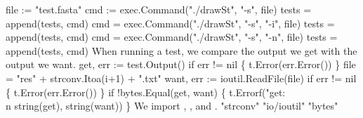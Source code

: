 file := "test.fasta"
cmd := exec.Command("./drawSt", "-s", file)
tests = append(tests, cmd)
cmd = exec.Command("./drawSt", "-s", "-i", file)
tests = append(tests, cmd)
cmd = exec.Command("./drawSt", "-s", "-n", file)
tests = append(tests, cmd)
\nwendcode{}\nwdocspar
When running a test, we compare the output we get with the output we
want.
\nwenddocs{}\endmoddef\nwstartdeflinemarkup{}\nwenddeflinemarkup
get, err := test.Output()
if err != nil \{ t.Error(err.Error()) \}
file = "res" + strconv.Itoa(i+1) + ".txt"
want, err := ioutil.ReadFile(file)
if err != nil \{ t.Error(err.Error()) \}
if !bytes.Equal(get, want) \{
          t.Errorf("get:\\n%
                  string(get), string(want))
\}
\nwendcode{}\nwdocspar
We import , , and .
\nwenddocs{}\plusendmoddef\nwstartdeflinemarkup{}\nwenddeflinemarkup
"strconv"
"io/ioutil"
"bytes"
\nwendcode{}

